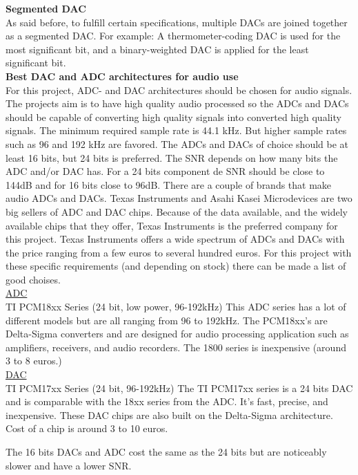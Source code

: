         \textbf{Segmented DAC}\\
        As said before, to fulfill certain specifications, multiple DACs are joined together as a segmented DAC. For example: A thermometer-coding DAC is used for the most significant bit, and a binary-weighted DAC is applied for the least significant bit. \\

        \textbf{Best DAC and ADC architectures for audio use}\\
        \noindent For this project, ADC- and DAC architectures should be chosen for audio signals. The projects aim is to have high quality audio processed so the ADCs and DACs should be capable of converting high quality signals into converted high quality signals. The minimum required sample rate is 44.1 kHz. But higher sample rates such as 96 and 192 kHz are favored. The ADCs and DACs of choice should be at least 16 bits, but 24 bits is preferred. The SNR depends on how many bits the ADC and/or DAC has. For a 24 bits component de SNR should be close to 144dB and for 16 bits close to 96dB. 
There are a couple of brands that make audio ADCs and DACs. Texas Instruments and Asahi Kasei Microdevices are two big sellers of ADC and DAC chips. Because of the data available, and the widely available chips that they offer, Texas Instruments is the preferred company for this project.
Texas Instruments offers a wide spectrum of ADCs and DACs with the price ranging from a few euros to several hundred euros.
For this project with these specific requirements (and depending on stock) there can be made a list of good choises.\\

\underline{ADC}\\
TI PCM18xx Series (24 bit, low power, 96-192kHz)
This ADC series has a lot of different models but are all ranging from 96 to 192kHz. The PCM18xx’s are Delta-Sigma converters and are designed for audio processing application such as amplifiers, receivers, and audio recorders. The 1800 series is inexpensive (around 3 to 8 euros.) \\

\underline{DAC}\\
TI PCM17xx Series (24 bit, 96-192kHz)
The TI PCM17xx series is a 24 bits DAC and is comparable with the 18xx series from the ADC. It’s fast, precise, and inexpensive. These DAC chips are also built on the Delta-Sigma architecture. Cost of a chip is around 3 to 10 euros. 

The 16 bits DACs and ADC cost the same as the 24 bits but are noticeably slower and have a lower SNR.\\

